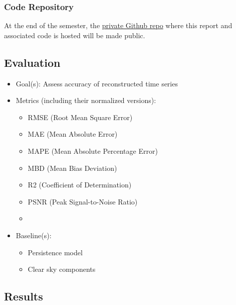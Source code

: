 \begin{multicols}{2}
\subsubsection{Code Repository}

At the end of the semester, the \href{https://github.com/avega17/CCOM_MS_Spring_2025_EO_PV_research}{private Github repo} where this report and associated code is hosted will be made public.

\subsection{Evaluation}
    \begin{itemize}
        \item Goal(s): Assess accuracy of reconstructed time series 
        \item Metrics (including their normalized versions):
        \begin{itemize}
            \item RMSE (Root Mean Square Error)
            \item MAE (Mean Absolute Error)
            \item MAPE (Mean Absolute Percentage Error)
            \item MBD (Mean Bias Deviation)
            \item R2 (Coefficient of Determination)
            \item PSNR (Peak Signal-to-Noise Ratio)
            \item 
        \end{itemize}
        \item Baseline(s):
            \begin{itemize}
                \item Persistence model 
                \item Clear sky components
            \end{itemize}
    \end{itemize}

\subsection{Results}

\end{multicols}
\bigskip